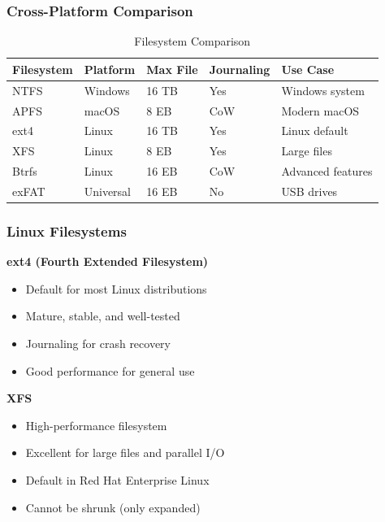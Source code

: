\subsubsection{Cross-Platform Comparison}

\begin{table}[htbp]
    \centering
    \caption{Filesystem Comparison}
    \label{tab:filesystem-comparison}
    \begin{tabular}{@{}lllll@{}}
        \toprule
        \textbf{Filesystem} & \textbf{Platform} & \textbf{Max File} & \textbf{Journaling} & \textbf{Use Case} \\
        \midrule
        NTFS & Windows & 16 TB & Yes & Windows system \\
        APFS & macOS & 8 EB & CoW & Modern macOS \\
        ext4 & Linux & 16 TB & Yes & Linux default \\
        XFS & Linux & 8 EB & Yes & Large files \\
        Btrfs & Linux & 16 EB & CoW & Advanced features \\
        exFAT & Universal & 16 EB & No & USB drives \\
        \bottomrule
    \end{tabular}
\end{table}

\subsubsection{Linux Filesystems}

\textbf{ext4 (Fourth Extended Filesystem)}
\begin{itemize}
    \item Default for most Linux distributions
    \item Mature, stable, and well-tested
    \item Journaling for crash recovery
    \item Good performance for general use
\end{itemize}

\noindent
\textbf{XFS}
\begin{itemize}
    \item High-performance filesystem
    \item Excellent for large files and parallel I/O
    \item Default in Red Hat Enterprise Linux
    \item Cannot be shrunk (only expanded)
\end{itemize}

